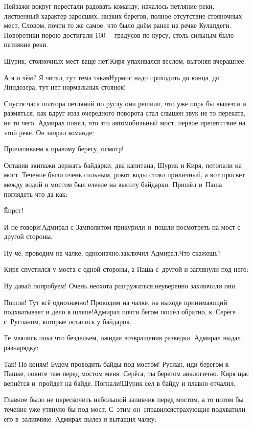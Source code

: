 Пейзажи вокруг перестали радовать команду, началось петляние реки, лиственный характер заросших, низких берегов, полное отсутствие стояночных мест. Словом, почти то же самое, что было днём ранее на речке Кулапдеги. Поворотики порою достигали 160\thinspace\nobreakdash--- градусов по курсу, столь сильным было петляние реки.

\diagdash Шурик, стояночных мест ваще нет!\mdash Киря упахивался веслом, выгоняя вчерашнее.

\diagdash А я о чём? Я читал, тут тема такая\mdash Нурмис надо проходить до конца, до Линдозера, тут нет нормальных стоянок!

Спустя часа полтора петляний по руслу они решили, что уже пора бы вылезти и размяться, как вдруг из\sdash за очередного поворота стал слышен звук не то переката, не то чего. Адмирал понял, что это автомобильный мост, первое препятствие на этой реке. Он заорал команде:

\diagdash Причаливаем к правому берегу, осмотр!

Оставив экипажи держать байдарки, два капитана, Шурик и Киря, потопали на мост. Течение было очень сильным, рокот воды стоял приличный, а вот просвет между водой и мостом был еле\sdash еле на высоту байдарки. Пришёл и~Паша поглядеть что да как:

\diagdash Ёпрст!

\diagdash И не говори!\mdash Адмирал с Замполитом прикурили и~пошли посмотреть на мост с другой стороны.

\diagdash Ну чё, проводим на чалке, однозначно.\mdash заключил Адмирал.\mdash Что скажешь?

Киря спустился у моста с одной стороны, а Паша с~другой и заглянули под него:

\diagdash Ну давай попробуем! Очень неохота разгружаться.\mdash неуверенно заключили они.

\diagdash Пошли! Тут всё однозначно! Проводим на чалке, на выходе принимающий подхватывает и дело в шляпе!\mdash Адмирал почти бегом пошёл обратно, к~Серёге с~Русланом, которые остались у байдарок.

Те маялись пока что бездельем, ожидая возвращения разведки. Адмирал выдал разнарядку:

\diagdash Так! По коням! Будем проводить байды под мостом! Руслан, иди берегом к Пашке, ловите там перед мостом меня. Серёга, ты берегом аналогично. Киря щас вернётся и~пройдет на байде. Погнали!\mdash Шурик сел в байду и плавно отчалил. 

Главное было не перескочить небольшой заливчик перед мостом, а то потом бы течение уже утянуло бы под мост. С~этим он~справился\mdash страхующие подхватили его в~заливчике. Адмирал вылез и вытащил чалку:

